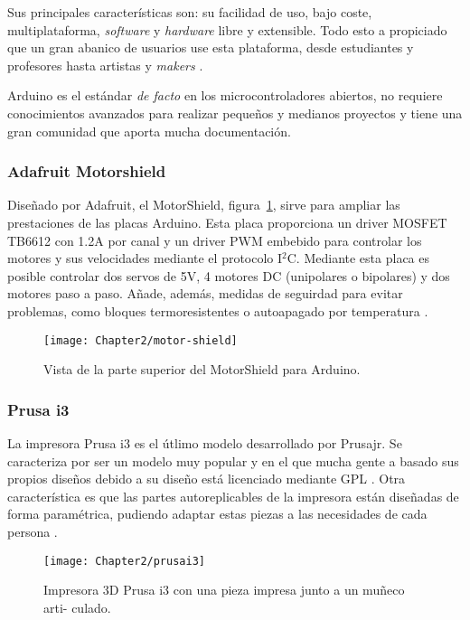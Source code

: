 Sus principales características son: su facilidad de uso, bajo coste,
multiplataforma, \textit{software} y \textit{hardware} libre y extensible. Todo
esto a propiciado que un gran abanico de usuarios use esta plataforma, desde
estudiantes y profesores hasta artistas y \textit{makers} \cite{arduino-intro}.

Arduino es el estándar \textit{de facto} en los microcontroladores abiertos, no
requiere conocimientos avanzados para realizar pequeños y medianos proyectos y
tiene una gran comunidad que aporta mucha documentación.


\subsubsection{Adafruit Motorshield}
\label{subs:adafruit motor shield}


Diseñado por Adafruit, el MotorShield, figura~\ref{fig:motor-shield},  sirve
para ampliar las prestaciones de las placas Arduino. Esta placa proporciona un
driver MOSFET TB6612 con 1.2A por canal y un driver PWM embebido para controlar
los motores y sus velocidades mediante el protocolo I$^2$C. Mediante esta placa
es posible controlar dos servos de 5V, 4 motores DC (unipolares o bipolares) y
dos motores paso a paso. Añade, además, medidas de seguirdad para evitar problemas,
como bloques termoresistentes o autoapagado por temperatura \cite{motorshield}.

\begin{figure}[htp]
  \centering
    \texttt{[image: Chapter2/motor-shield]}
  \caption{Vista de la parte superior del MotorShield para Arduino.}
\label{fig:motor-shield}
\end{figure}

\subsubsection{Prusa i3}
\label{subs:prusa-i3}

La impresora Prusa i3 es el útlimo modelo desarrollado por Prusajr. Se caracteriza
por ser un modelo muy popular y en el que mucha gente a basado sus propios diseños
debido a su diseño está licenciado mediante GPL \cite{prusa1}. Otra característica
es que las partes autoreplicables de la impresora están diseñadas de forma
paramétrica, pudiendo adaptar estas piezas a las necesidades de cada persona
\cite{prusa2}.

\begin{figure}[htp]
  \centering
    \texttt{[image: Chapter2/prusai3]}
  \caption{Impresora 3D Prusa i3 con una pieza impresa junto a un muñeco arti-
culado.}
\label{fig:prusai3}
\end{figure}

